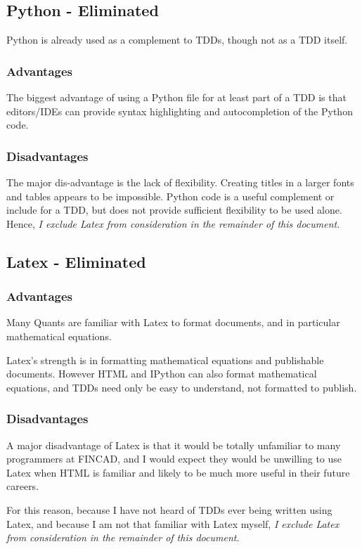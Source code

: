 \documentclass[]{article}
\begin{document}
\subsection{Python - Eliminated}
	Python is already used as a complement to TDDs, though not as a TDD itself.
	\subsubsection{Advantages}
	The biggest advantage of using a Python file for at least part of a TDD 
	is that editors/IDEs can provide syntax highlighting and autocompletion of the Python code.
	
	\subsubsection{Disadvantages}
	The major dis-advantage is the lack of flexibility.  Creating titles in a larger fonts and tables appears to be impossible.  
	Python code is a useful complement or include for a TDD, but does not provide sufficient flexibility to be used alone.  
	Hence, \emph{I exclude Latex from consideration in the remainder of this document}.


\subsection{Latex - Eliminated}
	\subsubsection{Advantages}
	
	Many Quants are familiar with Latex to format documents, and in particular mathematical equations.
	
	Latex's strength is in formatting mathematical equations and publishable documents.  
	However HTML and IPython can also format mathematical equations, and TDDs need only be easy to understand, not formatted to publish.
	
	\subsubsection{Disadvantages}
	A major disadvantage of Latex is that it would be totally unfamiliar to many programmers at FINCAD, 
	and I would expect they would be unwilling to use Latex when HTML is familiar and likely to be much more useful in their future careers.
	
	For this reason, because I have not heard of TDDs ever being written using Latex, and because I am not that familiar with Latex myself, 
	\emph{I exclude Latex from consideration in the remainder of this document}.
\end{document}
